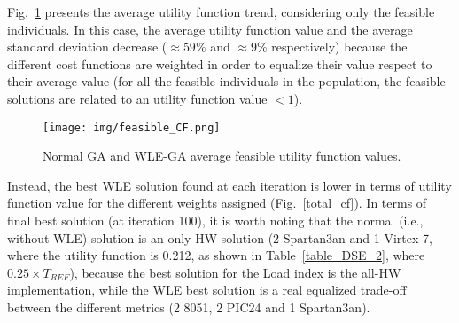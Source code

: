%
Fig.~\ref{feasible_CF} presents the average utility function trend, considering only the feasible individuals. In this case, the average utility function value and the average standard deviation decrease ($\approx 59\%$ and $\approx 9\%$ respectively) because the different cost functions are weighted in order to equalize their value respect to their average value (for all the feasible individuals in the population, the feasible solutions are related to an utility function value $< 1$). \par
%
\begin{figure}[htbp]
	\centerline{\texttt{[image: img/feasible\_CF.png]}}
	\caption{Normal GA and WLE-GA average feasible utility function values.}
	\label{feasible_CF}
\end{figure}
%
Instead, the best WLE solution found at each iteration is lower in terms of utility function value for the different weights assigned (Fig.~\ref{total_cf}). In terms of final best solution (at iteration 100), it is worth noting that the normal (i.e., without WLE) solution is an only-HW solution (2 Spartan3an and 1 Virtex-7, where the utility function is 0.212, as shown in Table~\ref{table_DSE_2}, where $0.25 \times T_{REF}$), because the best solution for the Load index is the all-HW implementation, while the WLE best solution is a real equalized trade-off between the different metrics (2 8051, 2 PIC24 and 1 Spartan3an).\par %
